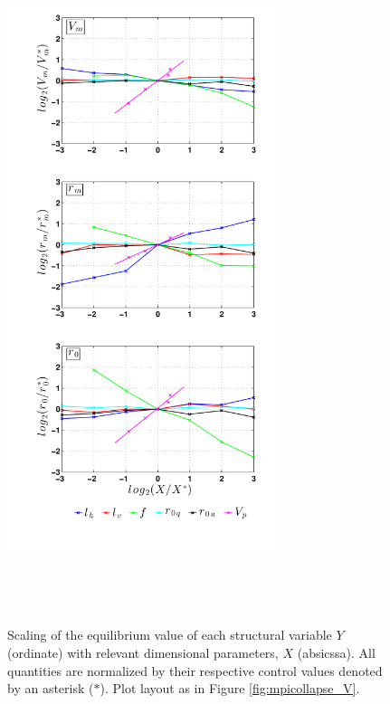 \documentclass[12pt]{article}
\begin{document}
\begin{figure}[h!]
\centering
  \noindent\includegraphics[width=8cm,height=20cm]{FIGURES_TC_RCE_equilibrium_v2.0/Fig6_Dimensional_scaling.pdf}
\caption{Scaling of the equilibrium value of each structural variable $Y$ (ordinate) with relevant dimensional parameters, $X$ (absicssa). All quantities are normalized by their respective control values denoted by an asterisk ($*$). Plot layout as in Figure \ref{fig:mpicollapse_V}.}
\label{fig:dimscaling}
\end{figure}
\end{document}
